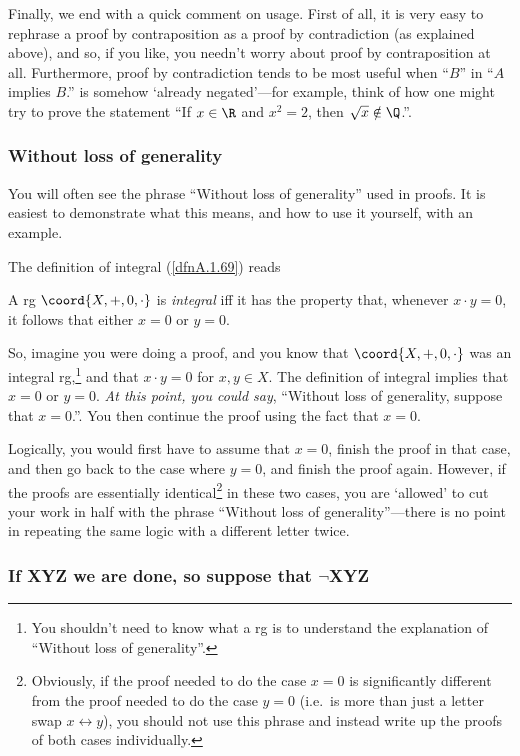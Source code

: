 Finally, we end with a quick comment on usage.  First of all, it is very easy to rephrase a proof by contraposition as a proof by contradiction (as explained above), and so, if you like, you needn't worry about proof by contraposition at all.  Furthermore, proof by contradiction tends to be most useful when ``$B$'' in ``$A$ implies $B$.'' is somehow `already negated'---for example, think of how one might try to prove the statement ``If $x\in \R$ and $x^2=2$, then $\sqrt{x}\notin \Q$.''. 

\subsubsection{Without loss of generality\textellipsis}

You will often see the phrase ``Without loss of generality\textellipsis'' used in proofs.  It is easiest to demonstrate what this means, and how to use it yourself, with an example.

The definition of integral (\cref{dfnA.1.69}) reads
\begin{displayquote}
A rg $\coord{X,+,0,\cdot}$ is \emph{integral} iff it has the property that, whenever $x\cdot y=0$, it follows that either $x=0$ or $y=0$.
\end{displayquote}
So, imagine you were doing a proof, and you know that $\coord{X,+,0,\cdot}$ was an integral rg,\footnote{You shouldn't need to know what a rg is to understand the explanation of ``Without loss of generality\textellipsis ''.} and that $x\cdot y=0$ for $x,y\in X$.  The definition of integral implies that $x=0$ or $y=0$.  \emph{At this point, you could say}, ``Without loss of generality, suppose that $x=0$.''.  You then continue the proof using the fact that $x=0$.

Logically, you would first have to assume that $x=0$, finish the proof in that case, and then go back to the case where $y=0$, and finish the proof again.  However, if the proofs are essentially identical\footnote{Obviously, if the proof needed to do the case $x=0$ is significantly different from the proof needed to do the case $y=0$ (i.e.~is more than just a letter swap $x\leftrightarrow y$), you should not use this phrase and instead write up the proofs of both cases individually.} in these two cases, you are `allowed' to cut your work in half with the phrase ``Without loss of generality\textellipsis ''---there is no point in repeating the same logic with a different letter twice.

\subsubsection{If XYZ we are done, so suppose that \texorpdfstring{$\neg$}{not}XYZ}

